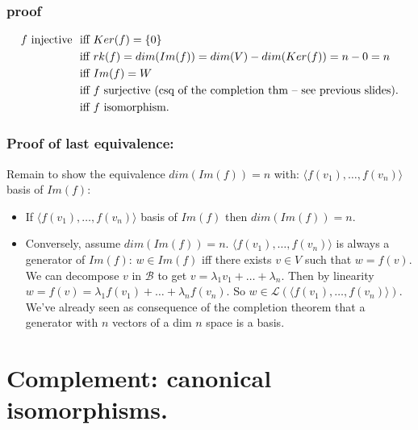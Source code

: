 \documentclass{beamer}
\begin{document}
\begin{frame}
  \frametitle{proof}
  \[
  \begin{aligned}
   f \textnormal{ injective } &\textnormal{ iff } Ker(f) = \{0\}\\
    &\textnormal{ iff } rk(f) = dim(Im(f)) = dim(V) - dim(Ker(f)) = n - 0 = n\\
    &\textnormal{ iff } Im(f) = W\\
    &\textnormal{ iff } f \textnormal{ surjective (csq of the completion thm -- see previous slides)}.\\
   &\textnormal{ iff } f\textnormal{ isomorphism}.
  \end{aligned}
  \]
\end{frame}

\begin{frame}
  \frametitle{Proof of last equivalence:}
  Remain to show the equivalence $dim(Im(f)) = n$ with: $\langle f(v_1), \dots, f(v_n) \rangle$ basis of $Im(f)$:
  \begin{itemize}
  \item If $\langle f(v_1), \dots, f(v_n) \rangle$ basis of $Im(f)$ then $dim(Im(f)) = n$.
  \item Conversely, assume $dim(Im(f)) = n$. $\langle f(v_1), \dots, f(v_n) \rangle$ is always a generator of $Im(f)$: $w \in Im(f)$ iff there exists  $v \in V$ such that $w = f(v)$. We can decompose $v$ in $\mathcal{B}$ to get $ v = \lambda_1 v_1 +  \dots + \lambda_n$. Then by linearity $w = f(v) = \lambda_1 f(v_1) + \dots + \lambda_n f(v_n)$. So $w \in \mathcal{L}(\langle f(v_1), \dots, f(v_n) \rangle)$. We've already seen as consequence of the completion theorem that a generator with $n$ vectors of a dim $n$ space is a basis.
  \end{itemize}
\end{frame}



\section{Complement: canonical isomorphisms.}
\end{document}

